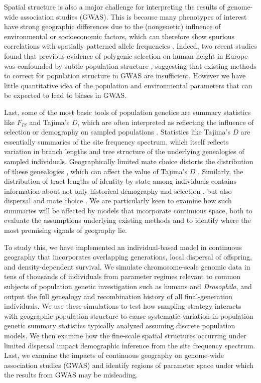\documentclass[10pt,twoside,lineno,hidelinks]{preprint} %
\begin{document}
Spatial structure is also a major challenge for interpreting the results of genome-wide association studies (GWAS). This is because many phenotypes of interest have strong geographic differences due to the (nongenetic) influence of environmental or socioeconomic factors,
which can therefore show spurious correlations with spatially patterned allele frequencies \citep{Bulik-Sullivan2015,Mathieson2012}. Indeed, two recent studies found that previous evidence of polygenic selection on human height in Europe was confounded by subtle population structure \citep{Sohail2018,Berg2018}, suggesting that existing methods to correct for population structure in GWAS are insufficient. However we have little quantitative idea of the population and environmental parameters that can be expected to lead to biases in GWAS. 

Last, some of the most basic tools of population genetics are summary statistics like $F_{IS}$ and Tajima's $D$, which are often interpreted as reflecting the influence of selection or demography on sampled populations \citep{tajima1989statistical}. Statistics like Tajima's $D$ are essentially summaries of the site frequency spectrum, which itself reflects variation in branch lengths and tree structure of the underlying genealogies of sampled individuals. Geographically limited mate choice distorts the distribution of these genealogies \citep{Maruyama1972,Wakeley1999}, which can affect the value of Tajima's $D$ \citep{Stadler2009}. Similarly, the distribution of tract lengths of identity by state among individuals contains information about not only historical demography \citep{Harris2013,ralph2013geography} and selection \citep{Garud2015}, but also dispersal and mate choice \citep{Ringbauer2017,Baharian2016}. 
We are particularly keen to examine how such summaries will be affected by models that incorporate continuous space, both to evaluate the assumptions underlying existing methods and to identify where the most promising signals of geography lie.

To study this, we have implemented an individual-based model in continuous geography 
that incorporates overlapping generations, local dispersal of offspring, and density-dependent survival. 
We simulate chromosome-scale genomic data in tens of thousands of individuals from parameter regimes relevant to common subjects of population genetic investigation such as humans and \textit{Drosophila}, and output the full genealogy and recombination history of all final-generation individuals. 
We use these simulations to test how sampling strategy interacts with geographic population structure to cause systematic variation in population genetic summary statistics 
typically analyzed assuming discrete population models. 
We then examine how the fine-scale spatial structures occurring under limited dispersal impact demographic inference from the site frequency spectrum. 
Last, we examine the impacts of continuous geography on genome-wide association studies (GWAS) and identify regions of parameter space under which the results from GWAS may be misleading.
\end{document}
